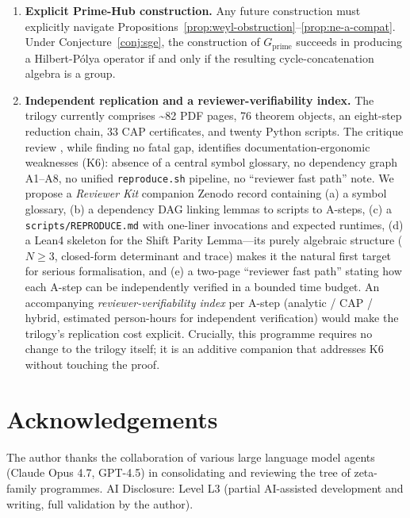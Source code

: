 \documentclass[11pt]{article}
\theoremstyle{definition}
\theoremstyle{remark}
\begin{document}
\begin{enumerate}
\item \textbf{Explicit Prime-Hub construction.} Any future
  construction must explicitly navigate
  Propositions~\ref{prop:weyl-obstruction}--\ref{prop:ne-a-compat}.
  Under Conjecture~\ref{conj:sge}, the construction of
  $G_\mathrm{prime}$ succeeds in producing a Hilbert-P\'olya
  operator if and only if the resulting cycle-concatenation
  algebra is a group.

\item \textbf{Independent replication and a reviewer-verifiability
  index.} The trilogy \cite{Geiger2026RHII,Geiger2026RHIII}
  currently comprises \textasciitilde{}82 PDF pages, 76 theorem
  objects, an eight-step reduction chain, 33 CAP certificates, and
  twenty Python scripts. The critique review
  \cite{RHCritiqueReview2026}, while finding no fatal gap,
  identifies documentation-ergonomic weaknesses (K6): absence of a
  central symbol glossary, no dependency graph A1--A8, no unified
  \texttt{reproduce.sh} pipeline, no ``reviewer fast path'' note.
  We propose a \emph{Reviewer Kit} companion Zenodo record
  containing (a) a symbol glossary, (b) a dependency DAG linking
  lemmas to scripts to A-steps, (c) a
  \texttt{scripts/REPRODUCE.md} with one-liner invocations and
  expected runtimes, (d) a Lean4 skeleton for the Shift Parity
  Lemma---its purely algebraic structure ($N \geq 3$, closed-form
  determinant and trace) makes it the natural first target for
  serious formalisation, and (e) a two-page ``reviewer fast path''
  stating how each A-step can be independently verified in a
  bounded time budget. An accompanying \emph{reviewer-verifiability
  index} per A-step (analytic / CAP / hybrid, estimated person-hours
  for independent verification) would make the trilogy's
  replication cost explicit. Crucially, this programme requires no
  change to the trilogy itself; it is an additive companion that
  addresses K6 without touching the proof.
\end{enumerate}

\section*{Acknowledgements}

The author thanks the collaboration of various large language model
agents (Claude Opus 4.7, GPT-4.5) in consolidating and reviewing the
tree of zeta-family programmes.
AI Disclosure: Level L3 (partial AI-assisted development and writing,
full validation by the author).
\end{document}
